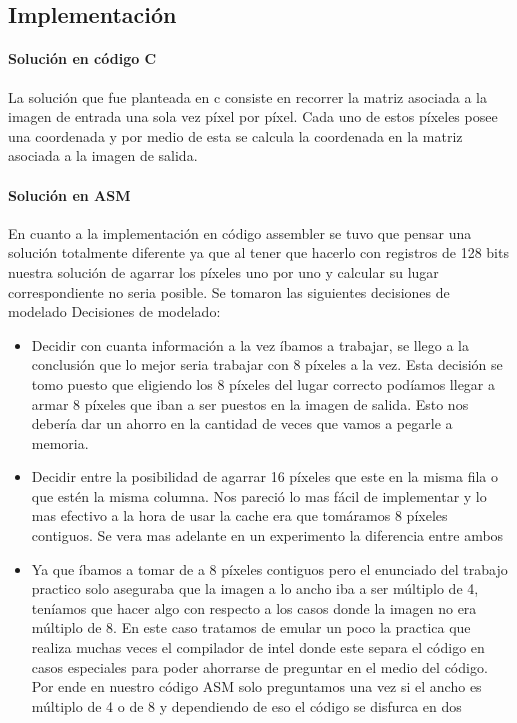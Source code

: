 \subsection{Implementación}
\paragraph{Solución en código C}
La solución que fue planteada en c consiste en recorrer la matriz asociada a la imagen de entrada una sola vez píxel por píxel. Cada uno de estos píxeles posee una coordenada y por medio de esta se calcula la coordenada en la matriz asociada a la imagen de salida. 


\paragraph{Solución en ASM}
En cuanto a la implementación en código assembler se tuvo que pensar una solución totalmente diferente ya que al tener que hacerlo con registros de 128 bits nuestra solución de agarrar los píxeles uno por uno y calcular su lugar correspondiente no seria posible. Se tomaron las siguientes decisiones de modelado Decisiones de modelado:
\begin{itemize}
\item Decidir con cuanta información a la vez íbamos a trabajar, se llego a la conclusión que lo mejor seria trabajar con 8 píxeles a la vez. Esta decisión se tomo puesto que eligiendo los 8 píxeles del lugar correcto podíamos llegar a armar 8 píxeles que iban a ser puestos en la imagen de salida. Esto nos debería dar un ahorro en la cantidad de veces que vamos a pegarle a memoria.
\item Decidir entre la posibilidad de agarrar 16 píxeles que este en la misma fila o que estén la misma columna. Nos pareció lo mas fácil de implementar y lo mas efectivo a la hora de usar la cache era que tomáramos 8 píxeles contiguos. Se vera mas adelante en un experimento la diferencia entre ambos
\item Ya que íbamos a tomar de a 8 píxeles contiguos pero el enunciado del trabajo practico solo aseguraba que la imagen a lo ancho iba a ser múltiplo de 4, teníamos que hacer algo con respecto a los casos donde la imagen no era múltiplo de 8. En este caso tratamos de emular un poco la practica que realiza muchas veces el compilador de intel donde este separa el código en casos especiales para poder ahorrarse de preguntar en el medio del código. Por ende en nuestro código ASM solo preguntamos una vez si el ancho es múltiplo de 4 o de 8 y dependiendo de eso el código se disfurca en dos
\end{itemize}

